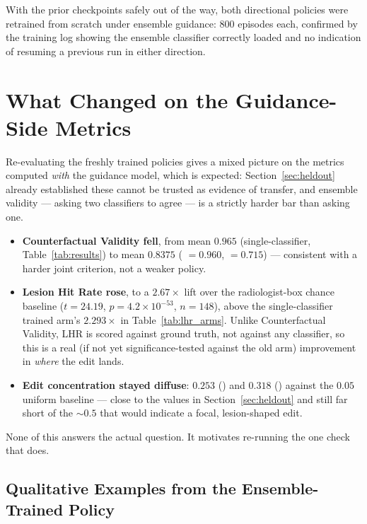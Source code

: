 With the prior checkpoints safely out of the way, both directional
policies were retrained from scratch under ensemble guidance: 800 episodes
each, confirmed by the training log showing the ensemble classifier
correctly loaded and no indication of resuming a previous run in either
direction.

\section{What Changed on the Guidance-Side Metrics}

Re-evaluating the freshly trained policies gives a mixed picture on the
metrics computed \emph{with} the guidance model, which is expected:
Section~\ref{sec:heldout} already established these cannot be trusted as
evidence of transfer, and ensemble validity --- asking two classifiers to
agree --- is a strictly harder bar than asking one.

\begin{itemize}[leftmargin=*]
  \item \textbf{Counterfactual Validity fell}, from mean $0.965$
        (single-classifier, Table~\ref{tab:results}) to mean $0.8375$
        (\ntop{} $=0.960$, \pton{} $=0.715$) --- consistent with a harder
        joint criterion, not a weaker policy.
  \item \textbf{Lesion Hit Rate rose}, to a $2.67\times$ lift over the
        radiologist-box chance baseline ($t=24.19$, $p=4.2\times10^{-53}$,
        $n=148$), above the single-classifier trained arm's $2.293\times$
        in Table~\ref{tab:lhr_arms}. Unlike Counterfactual Validity, LHR is
        scored against ground truth, not against any classifier, so this
        is a real (if not yet significance-tested against the old arm)
        improvement in \emph{where} the edit lands.
  \item \textbf{Edit concentration stayed diffuse}: $0.253$ (\ntop{}) and
        $0.318$ (\pton{}) against the $0.05$ uniform baseline --- close to
        the values in Section~\ref{sec:heldout} and still far short of the
        $\sim\!0.5$ that would indicate a focal, lesion-shaped edit.
\end{itemize}

None of this answers the actual question. It motivates re-running the one
check that does.

\subsection{Qualitative Examples from the Ensemble-Trained Policy}

